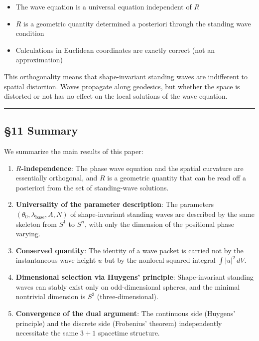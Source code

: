 \documentclass[
  a4paper,11pt]{article}
\providecommand{\tightlist}{%
  \setlength{\itemsep}{0pt}\setlength{\parskip}{0pt}}
\theoremstyle{definition}
\theoremstyle{remark}
\begin{document}
\begin{itemize}
\tightlist
\item
  The wave equation is a universal equation independent of \(R\)
\item
  \(R\) is a geometric quantity determined a posteriori through the
  standing wave condition
\item
  Calculations in Euclidean coordinates are exactly correct (not an
  approximation)
\end{itemize}

This orthogonality means that shape-invariant standing waves are
indifferent to spatial distortion. Waves propagate along geodesics, but
whether the space is distorted or not has no effect on the local
solutions of the wave equation.

\begin{center}\rule{0.5\linewidth}{0.5pt}\end{center}

\subsection{§11 Summary}\label{summary}

We summarize the main results of this paper:

\begin{enumerate}
\def\labelenumi{\arabic{enumi}.}
\item
  \textbf{\(R\)-independence}: The phase wave equation and the spatial
  curvature are essentially orthogonal, and \(R\) is a geometric
  quantity that can be read off a posteriori from the set of
  standing-wave solutions.
\item
  \textbf{Universality of the parameter description}: The parameters
  \((\theta_0, \lambda_{\text{base}}, A, N)\) of shape-invariant
  standing waves are described by the same skeleton from \(S^1\) to
  \(S^n\), with only the dimension of the positional phase varying.
\item
  \textbf{Conserved quantity}: The identity of a wave packet is carried
  not by the instantaneous wave height \(u\) but by the nonlocal squared
  integral \(\int |u|^2 \, dV\).
\item
  \textbf{Dimensional selection via Huygens' principle}: Shape-invariant
  standing waves can stably exist only on odd-dimensional spheres, and
  the minimal nontrivial dimension is \(S^3\) (three-dimensional).
\item
  \textbf{Convergence of the dual argument}: The continuous side
  (Huygens' principle) and the discrete side (Frobenius' theorem)
  independently necessitate the same \(3+1\) spacetime structure.
\end{enumerate}
\end{document}
